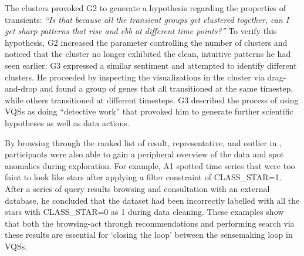 \par The clusters provoked G2 to generate a hypothesis regarding the properties of transients: \textit{``Is that because all the transient groups get clustered together, can I get sharp patterns that rise and ebb at different time points?''} To verify this hypothesis, G2 increased the parameter controlling the number of clusters and noticed that the cluster no longer exhibited the clean, intuitive patterns he had seen earlier. G3 expressed a similar sentiment and attempted to identify different clusters. He proceeded by inspecting the visualizations in the cluster via drag-and-drop and found a group of genes that all transitioned at the same timestep, while others transitioned at different timesteps. G3 described the process of using VQSs as doing ``detective work'' that provoked him to generate further scientific hypotheses as well as data actions.
\par By browsing through the ranked list of result, representative, and outlier in \zv, participants were also able to gain a peripheral overview of the data and spot anomalies during exploration. For example, A1 spotted time series that were too faint to look like stars after applying a filter constraint of CLASS\_STAR=1. After a series of query results browsing and consultation with an external database, he concluded that the dataset had been incorrectly labelled with all the stars with CLASS\_STAR=0 as 1 during data cleaning. These examples show that both the browsing-act through recommendations and performing search via these results are essential for `closing the loop' between the sensemaking loop in VQSs. 
